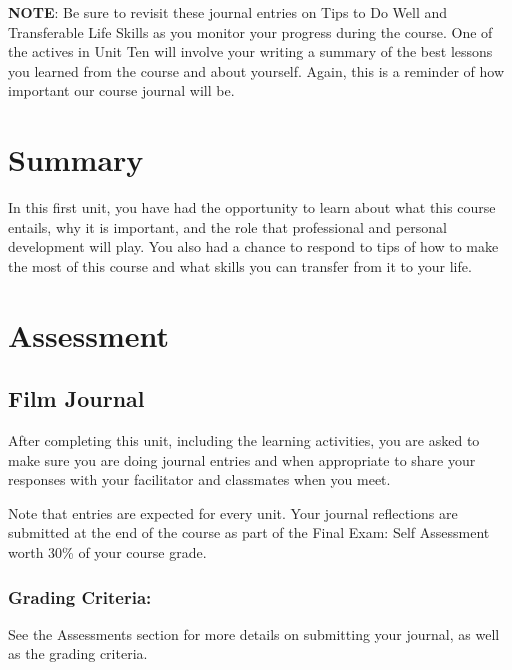 \documentclass[
]{book}
\begin{document}
\begin{caution}
\textbf{NOTE}: Be sure to revisit these journal entries on Tips to Do Well and Transferable Life Skills as you monitor your progress during the course. One of the actives in Unit Ten will involve your writing a summary of the best lessons you learned from the course and about yourself. Again, this is a reminder of how important our course journal will be.
\end{caution}

\hypertarget{summary}{%
\section*{Summary}\label{summary}}

In this first unit, you have had the opportunity to learn about what this course entails, why it is important, and the role that professional and personal development will play. You also had a chance to respond to tips of how to make the most of this course and what skills you can transfer from it to your life.

\hypertarget{assessment}{%
\section*{Assessment}\label{assessment}}

\begin{assessment}
\hypertarget{film-journal}{%
\subsection*{Film Journal}\label{film-journal}}

After completing this unit, including the learning activities, you are asked to make sure you are doing journal entries and when appropriate to share your responses with your facilitator and classmates when you meet.

Note that entries are expected for every unit. Your journal reflections are submitted at the end of the course as part of the Final Exam: Self Assessment worth 30\% of your course grade.

\hypertarget{grading-criteria}{%
\subsubsection*{Grading Criteria:}\label{grading-criteria}}

See the Assessments section for more details on submitting your journal, as well as the grading criteria.
\end{assessment}
\end{document}
